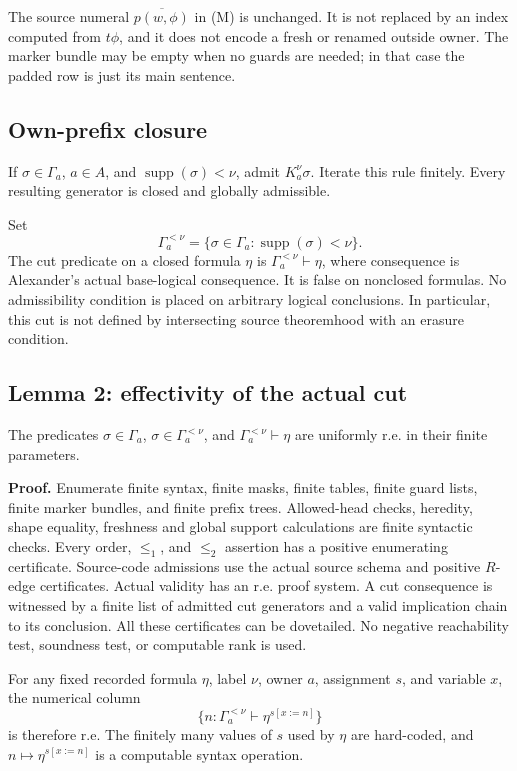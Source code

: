 \documentclass[
  11pt,
  letterpaper,
]{article}
\begin{document}
The source numeral \(\overline{p(w,\phi)}\) in (M) is unchanged. It is
not replaced by an index computed from \(t\phi\), and it does not encode
a fresh or renamed outside owner. The marker bundle may be empty when no
guards are needed; in that case the padded row is just its main
sentence.

\subsection{Own-prefix closure}\label{own-prefix-closure}

If \(\sigma\in\Gamma_a\), \(a\in A\), and
\(\operatorname{supp}(\sigma)<\nu\), admit \(K_a^\nu\sigma\). Iterate
this rule finitely. Every resulting generator is closed and globally
admissible.

Set \[
\Gamma_a^{<\nu}=
\{\sigma\in\Gamma_a:\operatorname{supp}(\sigma)<\nu\}.
\] The cut predicate on a closed formula \(\eta\) is
\(\Gamma_a^{<\nu}\vdash\eta\), where consequence is Alexander's actual
base-logical consequence. It is false on nonclosed formulas. No
admissibility condition is placed on arbitrary logical conclusions. In
particular, this cut is not defined by intersecting source theoremhood
with an erasure condition.

\subsection{Lemma 2: effectivity of the actual
cut}\label{lemma-2-effectivity-of-the-actual-cut}

The predicates \(\sigma\in\Gamma_a\), \(\sigma\in\Gamma_a^{<\nu}\), and
\(\Gamma_a^{<\nu}\vdash\eta\) are uniformly r.e. in their finite
parameters.

\textbf{Proof.} Enumerate finite syntax, finite masks, finite tables,
finite guard lists, finite marker bundles, and finite prefix trees.
Allowed-head checks, heredity, shape equality, freshness and global
support calculations are finite syntactic checks. Every order,
\(\leq_1\), and \(\leq_2\) assertion has a positive enumerating
certificate. Source-code admissions use the actual source schema and
positive \(R\)-edge certificates. Actual validity has an r.e. proof
system. A cut consequence is witnessed by a finite list of admitted cut
generators and a valid implication chain to its conclusion. All these
certificates can be dovetailed. No negative reachability test, soundness
test, or computable rank is used.

For any fixed recorded formula \(\eta\), label \(\nu\), owner \(a\),
assignment \(s\), and variable \(x\), the numerical column \[
\{n:\Gamma_a^{<\nu}\vdash\eta^{s[x:=n]}\}
\] is therefore r.e. The finitely many values of \(s\) used by \(\eta\)
are hard-coded, and \(n\mapsto\eta^{s[x:=n]}\) is a computable syntax
operation.
\end{document}

